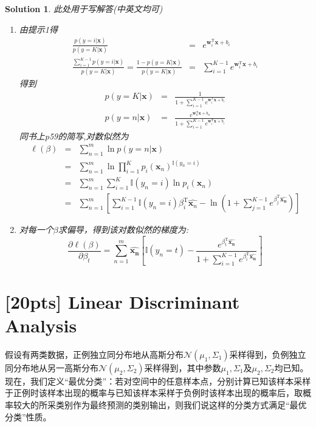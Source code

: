\documentclass[a4paper,UTF8]{article}
\numberwithin{equation}{section}
\newtheorem*{solution}{Solution}
\begin{document}
\begin{solution}
	此处用于写解答(中英文均可)
\begin{enumerate}[(1)]
	\item 由提示1得\\
	\begin{eqnarray*}
	\frac{p(y=i|\mathbf{x})}{p(y=K|\mathbf{x})}&=&e^{\mathbf{w}_i^\mathrm{T}\mathbf{x}+b_i}\\
	\frac{\sum^{K-1}_{i=1}p(y=i|\mathbf{x})}{p(y=K|\mathbf{x})}
	=\frac{1-p(y=K|\mathbf{x})}{p(y=K|\mathbf{x})}
	&=&\sum^{K-1}_{i=1}e^{\mathbf{w}_i^\mathrm{T}\mathbf{x}+b_i}
	\end{eqnarray*}
	得到
	\begin{eqnarray*}
		p(y=K|\mathbf{x})&=&\frac{1}{1+\sum^{K-1}_{i=1}e^{\mathbf{w}_i^\mathrm{T}\mathbf{x}+b_i}}\\
		p(y=n|\mathbf{x})&=&\frac{e^{\mathbf{w}_n^\mathrm{T}\mathbf{x}+b_n}}{1+\sum^{K-1}_{i=1}e^{\mathbf{w}_i^\mathrm{T}\mathbf{x}+b_i}}
	\end{eqnarray*}
	同书上p59的简写,对数似然为
	\begin{eqnarray*}
		\ell(\beta)&=&\sum^{m}_{n=1}{\ln{p(y=n|\mathbf{x})}}\\
		&=&\sum^{m}_{n=1}{\ln{\prod^{K}_{i=1}{p_i(\mathbf{x}_n)^{\mathbb{I}(y_n=i)}}}}\\
		&=&\sum^{m}_{n=1}{\sum^{K}_{i=1}{\mathbb{I}(y_n=i)\ln{{p_i(\mathbf{x}_n)}}}}\\
		&=&\sum^{m}_{n=1}{[\sum^{K-1}_{i=1}\mathbb{I}(y_n=i)\beta^\mathrm{T}_i\hat{\mathbf{x}_n}-\ln(1+\sum^{K-1}_{j=1}e^{\beta_j^\mathrm{T}\hat{\mathbf{x_n}}})]}
	\end{eqnarray*}

	\item 对每一个$\beta$求偏导，得到该对数似然的梯度为:
	$$\frac{\partial\ell(\beta)}{\partial\beta_t}=
	\sum^{m}_{n=1}\hat{\mathbf{x_n}}[\mathbb{I}(y_n=t)-\frac{e^{\beta_t^\mathrm{T}\hat{\mathbf{x_n}}}}{1+\sum_{i=1}^{K-1}{e^{\beta_i^\mathrm{T}\hat{\mathbf{x_n}}}}}]$$
	\end{enumerate}
\end{solution}
\newpage


\section{[20pts] Linear Discriminant Analysis}
假设有两类数据，正例独立同分布地从高斯分布$\mathcal{N}(\mu_1,\Sigma_1)$采样得到，负例独立同分布地从另一高斯分布$\mathcal{N}(\mu_2,\Sigma_2)$采样得到，其中参数$\mu_1,\Sigma_1$及$\mu_2,\Sigma_2$均已知。现在，我们定义“最优分类”：若对空间中的任意样本点，分别计算已知该样本采样于正例时该样本出现的概率与已知该样本采样于负例时该样本出现的概率后，取概率较大的所采类别作为最终预测的类别输出，则我们说这样的分类方式满足“最优分类”性质。
\end{document}
